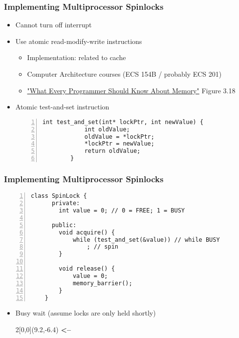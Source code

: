 \documentclass[mathserif,serif,14pt,aspectratio=169]{beamer}
\begin{document}
\begin{frame} [fragile]
	\frametitle{Implementing Multiprocessor Spinlocks}
	\begin{itemize}\setlength\itemsep{0.5em}
	\item<1-> Cannot turn off interrupt
	\item<1-> Use atomic read-modify-write instructions
		\begin{itemize}\setlength\itemsep{0.3em}
		\item<1-> Implementation: related to cache
		\item<1-> Computer Architecture courses (ECS 154B / probably ECS 201)
		\item<1->
			\href{https://people.freebsd.org/~lstewart/articles/cpumemory.pdf
				}{"What Every Programmer Should Know About Memory"}
				Figure 3.18
		\end{itemize}
	\item<2-> Atomic test-and-set instruction
		{
		\small
		\begin{lstlisting}[style=cstyle, gobble=8, frame=single, 
							numbers=left, numberstyle=\ttfamily]
		int test_and_set(int* lockPtr, int newValue) {
			int oldValue;
			oldValue = *lockPtr;
			*lockPtr = newValue;
			return oldValue;
		}
		\end{lstlisting}
		}
	\end{itemize}
\end{frame}

\begin{frame} [fragile]
	\frametitle{Implementing Multiprocessor Spinlocks}
	{
	\fontsize{8}{8}\selectfont
	\begin{lstlisting}[style=cstyle, gobble=4, frame=single, 
						numbers=left, numberstyle=\ttfamily]
	class SpinLock {
	  private:
		int value = 0; // 0 = FREE; 1 = BUSY

	  public:
		void acquire() {
			while (test_and_set(&value)) // while BUSY
			    ; // spin
		}

		void release() {
			value = 0;
			memory_barrier();
		}
	}
	\end{lstlisting}
	}
	\begin{itemize}\setlength\itemsep{0.5em}
	\item<2-> Busy wait (assume locks are only held shortly)
		\begin{textblock}{2}[0,0](9.2,-6.4)
			{\color{red} \textbf{<--}}	%
		\end{textblock}
	\end{itemize}
\end{frame}
\end{document}
